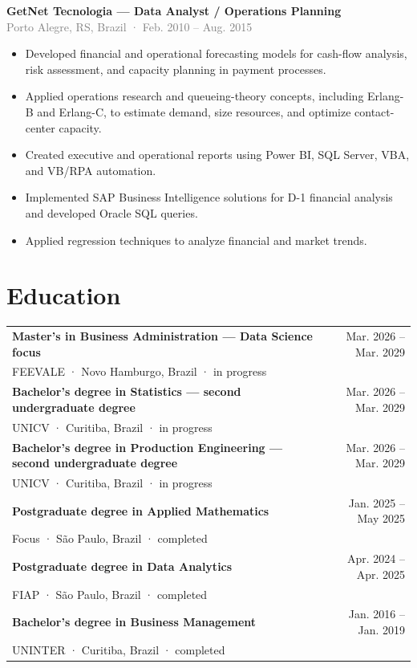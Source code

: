\documentclass[10pt,a4paper]{article}
\newcommand{\role}[3]{%
  \Needspace{13\baselineskip}%
  \textbf{#1}\\[-1pt]
  {\small\textcolor{grey}{#2}}\\[-1pt]
  #3\par}
\begin{document}
\role{GetNet Tecnologia — Data Analyst / Operations Planning}{Porto Alegre, RS, Brazil · Feb. 2010 – Aug. 2015}{
\begin{itemize}
  \item Developed financial and operational forecasting models for cash-flow analysis, risk assessment, and capacity planning in payment processes.
  \item Applied operations research and queueing-theory concepts, including Erlang-B and Erlang-C, to estimate demand, size resources, and optimize contact-center capacity.
  \item Created executive and operational reports using Power BI, SQL Server, VBA, and VB/RPA automation.
  \item Implemented SAP Business Intelligence solutions for D-1 financial analysis and developed Oracle SQL queries.
  \item Applied regression techniques to analyze financial and market trends.
\end{itemize}}

\section{Education}

\begin{tabularx}{\textwidth}{@{}Xr@{}}
\textbf{Master's in Business Administration — Data Science focus} & Mar. 2026 – Mar. 2029\\
FEEVALE · Novo Hamburgo, Brazil · in progress &\\[3pt]
\textbf{Bachelor's degree in Statistics — second undergraduate degree} & Mar. 2026 – Mar. 2029\\
UNICV · Curitiba, Brazil · in progress &\\[3pt]
\textbf{Bachelor's degree in Production Engineering — second undergraduate degree} & Mar. 2026 – Mar. 2029\\
UNICV · Curitiba, Brazil · in progress &\\[3pt]
\textbf{Postgraduate degree in Applied Mathematics} & Jan. 2025 – May 2025\\
Focus · São Paulo, Brazil · completed &\\[3pt]
\textbf{Postgraduate degree in Data Analytics} & Apr. 2024 – Apr. 2025\\
FIAP · São Paulo, Brazil · completed &\\[3pt]
\textbf{Bachelor's degree in Business Management} & Jan. 2016 – Jan. 2019\\
UNINTER · Curitiba, Brazil · completed &
\end{tabularx}
\end{document}
